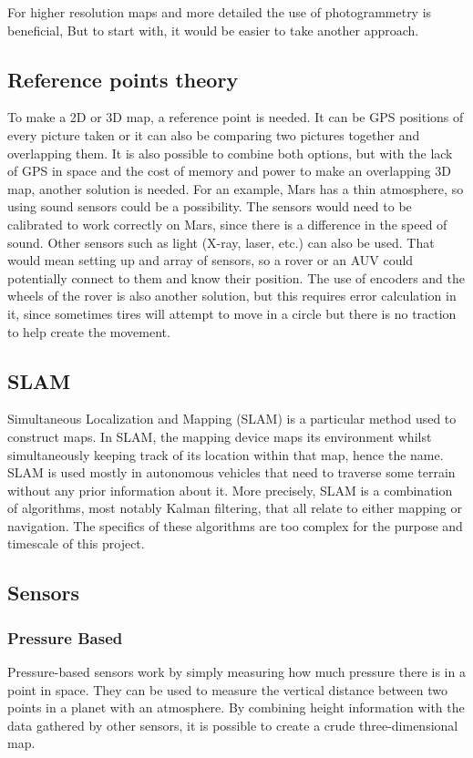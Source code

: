 For higher resolution maps and more detailed the use of photogrammetry is beneficial, But to start with, it would be easier to take another approach. %

\subsection{Reference points theory}

To make a 2D or 3D map, a reference point is needed. It can be GPS positions of every picture taken or it can also be comparing two pictures together and overlapping them. It is also possible to combine both options, but with the lack of GPS in space and the cost of memory and power to make an overlapping 3D map, another solution is needed. For an example, Mars has a thin atmosphere, so using sound sensors could be a possibility. The sensors would need to be calibrated to work correctly on Mars, since there is a difference in the speed of sound. Other sensors such as light (X-ray, laser, etc.) can also be used. That would mean setting up and array of sensors, so a rover or an AUV could potentially connect to them and know their position. The use of encoders and the wheels of the rover is also another solution, but this requires error calculation in it, since sometimes tires will attempt to move in a circle but there is no traction to help create the movement\cite{reference}.

\subsection{SLAM}

Simultaneous Localization and Mapping (SLAM) is a particular method used to construct maps. In SLAM, the mapping device maps its environment whilst simultaneously keeping track of its location within that map, hence the name. SLAM is used mostly in autonomous vehicles that need to traverse some terrain without any prior information about it. More precisely, SLAM is a combination of algorithms, most notably Kalman filtering, that all relate to either mapping or navigation. The specifics of these algorithms are too complex for the purpose and timescale of this project.

\subsection{Sensors}
\subsubsection{Pressure Based}
Pressure-based sensors work by simply measuring how much pressure there is in a point in space. They can be used to measure the vertical distance between two points in a planet with an atmosphere\cite{barometric1}\cite{barometric2}. By combining height information with the data gathered by other sensors, it is possible to create a crude three-dimensional map.

